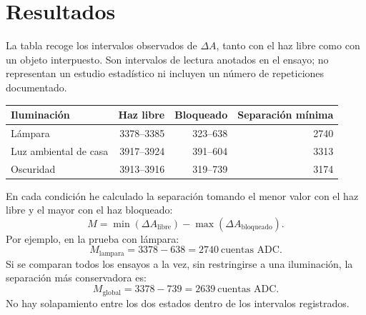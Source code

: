\documentclass[11pt,a4paper]{article}
\begin{document}
\begin{center}
\end{center}

\section{Resultados}
La tabla recoge los intervalos observados de $\Delta A$, tanto con el haz libre como con un objeto interpuesto. Son intervalos de lectura anotados en el ensayo; no representan un estudio estadístico ni incluyen un número de repeticiones documentado.

\begin{center}
\begin{tabularx}{\linewidth}{@{}Xrrr@{}}
\toprule
\textbf{Iluminación} & \textbf{Haz libre} & \textbf{Bloqueado} & \textbf{Separación mínima}\\
\midrule
Lámpara & 3378--3385 & 323--638 & 2740\\
Luz ambiental de casa & 3917--3924 & 391--604 & 3313\\
Oscuridad & 3913--3916 & 319--739 & 3174\\
\bottomrule
\end{tabularx}
\end{center}

En cada condición he calculado la separación tomando el menor valor con el haz libre y el mayor con el haz bloqueado:
\begin{equation}
M=\min(\Delta A_{\mathrm{libre}})-\max(\Delta A_{\mathrm{bloqueado}}).
\label{eq:margen}
\end{equation}
Por ejemplo, en la prueba con lámpara:
\begin{equation}
M_{\mathrm{lampara}}=3378-638=2740\ \text{cuentas ADC}.
\end{equation}
Si se comparan todos los ensayos a la vez, sin restringirse a una iluminación, la separación más conservadora es:
\begin{equation}
M_{\mathrm{global}}=3378-739=2639\ \text{cuentas ADC}.
\end{equation}
No hay solapamiento entre los dos estados dentro de los intervalos registrados.
\end{document}
